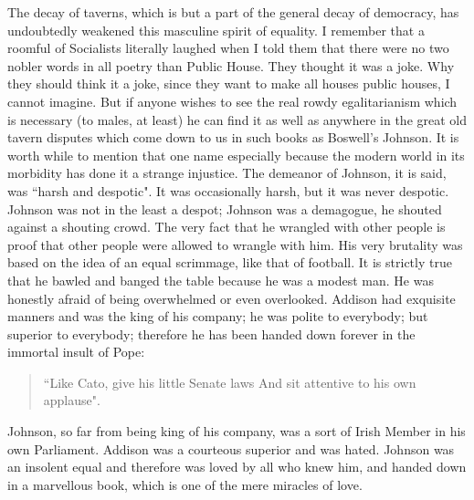 \documentclass[final,10pt,letterpaper,twocolumn,openany]{book}
\begin{document}
The decay of taverns, which is but a part of the general decay of
democracy, has undoubtedly weakened this masculine spirit of equality. I
remember that a roomful of Socialists literally laughed when I told them
that there were no two nobler words in all poetry than Public House. They
thought it was a joke. Why they should think it a joke, since they want to
make all houses public houses, I cannot imagine. But if anyone wishes to
see the real rowdy egalitarianism which is necessary (to males, at least) he
can find it as well as anywhere in the great old tavern disputes which come
down to us in such books as Boswell's Johnson. It is worth while to
mention that one name especially because the modern world in its
morbidity has done it a strange injustice. The demeanor of Johnson, it is
said, was ``harsh and despotic". It was occasionally harsh, but it was never
despotic. Johnson was not in the least a despot; Johnson was a demagogue,
he shouted against a shouting crowd. The very fact that he wrangled with
other people is proof that other people were allowed to wrangle with him.
His very brutality was based on the idea of an equal scrimmage, like that
of football. It is strictly true that he bawled and banged the table because
he was a modest man. He was honestly afraid of being overwhelmed or
even overlooked. Addison had exquisite manners and was the king of his
company; he was polite to everybody; but superior to everybody; therefore
he has been handed down forever in the immortal insult of Pope:
\begin{quotation}\noindent
	``Like Cato, give his little Senate laws And sit attentive to his own
	applause".
\end{quotation}
Johnson, so far from being king of his company, was a sort of Irish
Member in his own Parliament. Addison was a courteous superior and was
hated. Johnson was an insolent equal and therefore was loved by all who
knew him, and handed down in a marvellous book, which is one of the
mere miracles of love.
\end{document}
